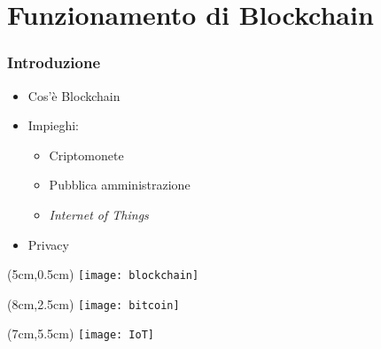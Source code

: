 \section{Funzionamento di Blockchain}
\begin{frame}
  \frametitle{Introduzione}

  \begin{itemize}
   \item<1-> Cos'è Blockchain
   \item<2-> Impieghi:
   \begin{itemize}
    \item Criptomonete
    \item Pubblica amministrazione
    \item \textit{Internet of Things}
   \end{itemize}
   \item<3-> Privacy
  \end{itemize}

 \begin{textblock*}{5cm}(5cm,0.5cm)
  \texttt{[image: blockchain]}
 \end{textblock*}

 \begin{textblock*}{5cm}(8cm,2.5cm)
  \texttt{[image: bitcoin]}
 \end{textblock*}

 \begin{textblock*}{5cm}(7cm,5.5cm)
  \texttt{[image: IoT]}
 \end{textblock*}

\end{frame}
